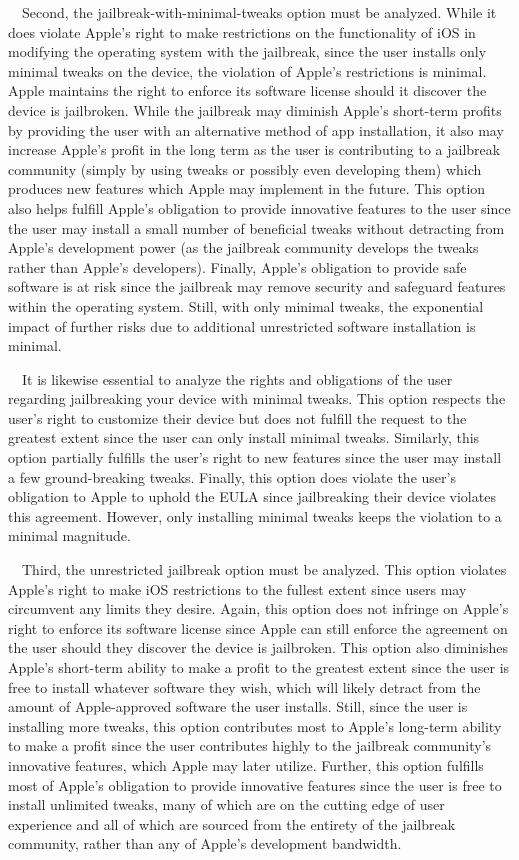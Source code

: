 \documentclass{article}
\begin{document}
\ \ Second, the jailbreak-with-minimal-tweaks option must be analyzed. While it does violate Apple's right to make
restrictions on the functionality of iOS in modifying the operating system with the jailbreak, since the user installs
only minimal tweaks on the device, the violation of Apple's restrictions is minimal. Apple maintains the right to
enforce its software license should it discover the device is jailbroken. While the jailbreak may diminish Apple's
short-term profits by providing the user with an alternative method of app installation, it also may increase Apple's
profit in the long term as the user is contributing to a jailbreak community (simply by using tweaks or possibly even
developing them) which produces new features which Apple may implement in the future. This option also helps fulfill
Apple's obligation to provide innovative features to the user since the user may install a small number of beneficial
tweaks without detracting from Apple's development power (as the jailbreak community develops the tweaks rather than
Apple's developers). Finally, Apple's obligation to provide safe software is at risk since the jailbreak may remove
security and safeguard features within the operating system. Still, with only minimal tweaks, the exponential impact of
further risks due to additional unrestricted software installation is minimal.

\ \ It is likewise essential to analyze the rights and obligations of the user regarding jailbreaking your device with
minimal tweaks. This option respects the user's right to customize their device but does not fulfill the request to the
greatest extent since the user can only install minimal tweaks. Similarly, this option partially fulfills the user's
right to new features since the user may install a few ground-breaking tweaks. Finally, this option does violate the
user's obligation to Apple to uphold the EULA since jailbreaking their device violates this agreement. However, only
installing minimal tweaks keeps the violation to a minimal magnitude.

\ \ Third, the unrestricted jailbreak option must be analyzed. This option violates Apple's right to make iOS
restrictions to the fullest extent since users may circumvent any limits they desire. Again, this option does not
infringe on Apple's right to enforce its software license since Apple can still enforce the agreement on the user
should they discover the device is jailbroken. This option also diminishes Apple's short-term ability to make a profit
to the greatest extent since the user is free to install whatever software they wish, which will likely detract from
the amount of Apple-approved software the user installs. Still, since the user is installing more tweaks, this option
contributes most to Apple's long-term ability to make a profit since the user contributes highly to the jailbreak
community's innovative features, which Apple may later utilize. Further, this option fulfills most of Apple's
obligation to provide innovative features since the user is free to install unlimited tweaks, many of which are on the
cutting edge of user experience and all of which are sourced from the entirety of the jailbreak community, rather than
any of Apple's development bandwidth.
\end{document}

